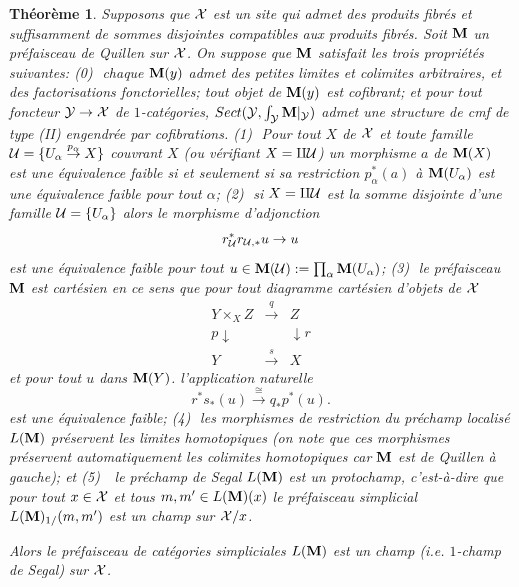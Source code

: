 \documentclass[12pt]{article}
\newtheorem{theoreme}[lemma]{Th\'eor\`eme}
\newcommand{\mm}{{\bf M}}
\newcommand{\Uu}{{\cal U}}
\newcommand{\Xx}{{\cal X}}
\newcommand{\Yy}{{\cal Y}}
\begin{document}
\begin{theoreme}
\label{dansleschamps}
Supposons
que $\Xx$ est un site qui admet des produits fibr\'es et suffisamment de sommes
disjointes compatibles aux produits fibr\'es.
Soit
$\mm$ un pr\'efaisceau de Quillen sur $\Xx$.  On suppose que $\mm$ satisfait les
trois propri\'et\'es suivantes: \newline
(0)\,\, chaque $\mm (y)$ admet des petites limites et colimites
arbitraires, et des factorisations fonctorielles;
tout objet de $\mm (y)$ est cofibrant; et
pour tout foncteur $\Yy \rightarrow \Xx$ de $1$-cat\'egories,
$Sect (\Yy , \int _{\Yy }\mm |_{\Yy})$ admet une structure de cmf de
type (II) engendr\'ee par cofibrations.
\newline
(1)\,\, Pour tout $X$ de $\Xx$ et
toute famille
$\Uu =\{ U_{\alpha}\stackrel{p_{\alpha}}{\rightarrow}
X\}$ couvrant $X$ (ou v\'erifiant $X=\amalg \Uu$)
un morphisme $a$ de $\mm (X)$ est une \'equivalence faible
si et seulement si sa restriction  $p_{\alpha}^{\ast}(a)$ \`a $\mm
(U_{\alpha})$  est une \'equivalence faible pour tout $\alpha$;
\newline
(2)\,\, si $X= \amalg \Uu$ est la somme disjointe d'une famille $\Uu =\{
U_{\alpha}\}$ alors le morphisme d'adjonction
$$
r_{\Uu}^{\ast} r_{\Uu , \ast}u\rightarrow u
$$
est une \'equivalence faible pour tout $u\in  \mm (\Uu ):= \prod _{\alpha} \mm
(U_{\alpha})$; 
\newline
(3)\,\, le pr\'efaisceau $\mm$ est {\em cart\'esien} en ce sens que pour
tout diagramme cart\'esien d'objets de $\Xx$
$$
\begin{array}{ccc}
Y\times _XZ & \stackrel{q}{\rightarrow} & Z \\
{\scriptstyle p}\downarrow && \downarrow {\scriptstyle r}\\
Y& \stackrel{s}{\rightarrow} & X
\end{array}
$$
et pour tout $u$ dans $\mm (Y)$.
l'application naturelle
$$
r^{\ast} s_{\ast} (u) \stackrel{\cong}{\rightarrow} q_{\ast} p^{\ast}(u).
$$
est une \'equivalence
faible; 
\newline
(4)\,\, les morphismes de restriction du pr\'echamp localis\'e $L(\mm )$ 
pr\'eservent les limites  homotopiques (on note que ces morphismes pr\'eservent
automatiquement les colimites homotopiques car 
$\mm$ est de Quillen \`a gauche); et
\newline
(5) \,\, le pr\'echamp de Segal $L(\mm )$ est  un protochamp, c'est-\`a-dire
que pour tout $x\in \Xx$ et tous $m,m' \in L(\mm )(x)$ le pr\'efaisceau
simplicial $L(\mm )_{1/}(m,m')$  est un champ sur $\Xx / x$.


Alors le pr\'efaisceau de cat\'egories simpliciales $L(\mm )$ est un champ (i.e.
$1$-champ de Segal) sur $\Xx$.
\end{theoreme}
\end{document}

